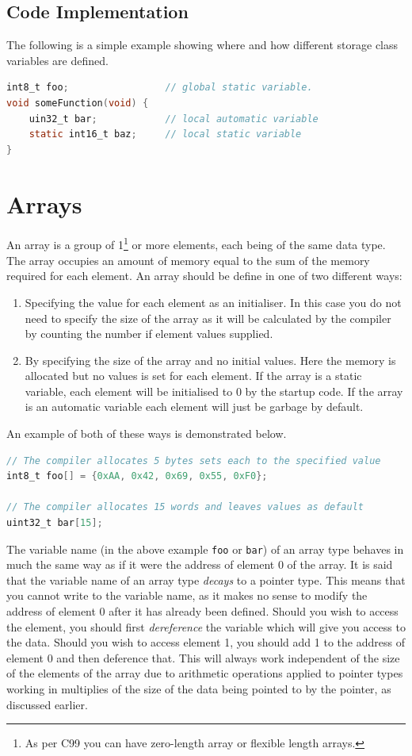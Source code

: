 \subsection{Code Implementation}
The following is a simple example showing where and how different storage class variables are defined.

\begin{lstlisting}[language=C]
int8_t foo;                 // global static variable. 
void someFunction(void) {
    uin32_t bar;            // local automatic variable
    static int16_t baz;     // local static variable
}
\end{lstlisting}


\section{Arrays}
An array is a group of 1\footnote{As per C99 you can have zero-length array or flexible length arrays.} or more elements, each being of the same data type.
The array occupies an amount of memory equal to the sum of the memory required for each element. An array should be define in one of two different ways:
\begin{enumerate}
    \item Specifying the value for each element as an initialiser. In this case you do not need to specify the size of the array as it will be calculated by the compiler by counting the number if element values supplied.
    \item By specifying the size of the array and no initial values. Here the memory is allocated but no values is set for each element. If the array is a static variable, each element will be initialised to 0 by the startup code. If the array is an automatic variable each element will just be garbage by default. 
\end{enumerate}

An example of both of these ways is demonstrated below.


\begin{lstlisting}[language=C]
// The compiler allocates 5 bytes sets each to the specified value
int8_t foo[] = {0xAA, 0x42, 0x69, 0x55, 0xF0};

// The compiler allocates 15 words and leaves values as default
uint32_t bar[15];
\end{lstlisting}

The variable name (in the above example \texttt{foo} or \texttt{bar}) of an array type behaves in much the same way as if it were the address of element 0 of the array. 
It is said that the variable name of an array type \emph{decays} to a pointer type.
This means that you cannot write to the variable name, as it makes no sense to modify the address of element 0 after it has already been defined. 
Should you wish to access the element, you should first \emph{dereference} the variable which will give you access to the data. 
Should you wish to access element 1, you should add 1 to the address of element 0 and then deference that. 
This will always work independent of the size of the elements of the array due to arithmetic operations applied to pointer types working in multiplies of the size of the data being pointed to by the pointer, as discussed earlier.

